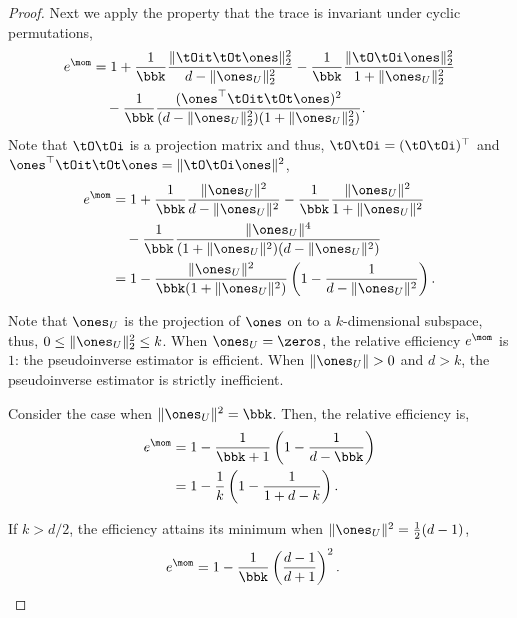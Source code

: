 \begin{proof}
Next we apply the property that the trace is invariant under cyclic
permutations,
\begin{align*}
  e^\mom
    &= 1 + \frac{1}{\bbk}
          \frac{
              \|\tOit \tOt \ones\|_2^2
          }{
            d - \|\ones_U\|_2^2 
          } 
        - \frac{1}{\bbk}
        \frac{\|\tO \tOi \ones\|_2^2}{1+ \|\ones_U\|_2^2} \\
    &\quad
    - \frac{1}{\bbk}
    \frac{(\ones^\top \tOit \tOt \ones)^2}
        {(d - \|\ones_U\|_2^2 ) (1+ \|\ones_U\|_2^2)}.
      \end{align*}
Note that $\tO\tOi$ is a projection matrix and thus, $\tO\tOi
      = (\tO\tOi)^\top$ and $\ones^\top \tOit\tOt \ones = \|\tO\tOi
      \ones\|^2$,
      \begin{align*}
        e^\mom
&= 1
+ \frac{1}{\bbk} \frac{\|\ones_U\|^2}{d - \|\ones_U\|^2}
    -  \frac{1}{\bbk}\frac{\|\ones_U\|^2}{1 + \|\ones_U\|^2}\\
&\quad
    -  \frac{1}{\bbk}\frac{\|\ones_U\|^4}{(1 + \|\ones_U\|^2)(d - \|\ones_U\|^2)} \\
    &= 1 - \frac{\|\ones_U\|^2}{\bbk (1 + \|\ones_U\|^2)} \left( 1 - \frac{1}{d - \|\ones_U\|^2} \right).
\end{align*}

Note that $\ones_U$ is the projection of $\ones$ on to a $k$-dimensional
subspace, thus, $0 \le \|\ones_U\|^2_2 \le k$.
When $\ones_U = \zeros$, the relative efficiency $e^\mom$ is $1$: the pseudoinverse estimator is efficient. When $\|\ones_U\| > 0$ and $d > k$, the pseudoinverse estimator is strictly inefficient.

Consider the case when $\|\ones_U\|^2 = \bbk$. Then, the relative efficiency
is,
\begin{align*}
  e^\mom 
    &= 1 - \frac{1}{\bbk +1} \left(1 - \frac{1}{d - \bbk} \right) \\
    &= 1 - \frac{1}{k} \left(1 - \frac{1}{1 + d - k} \right).
\end{align*}

If $k > d/2$, the efficiency attains its minimum when $\|\ones_U\|^2
= \frac{1}{2} (d-1)$, 
\begin{align*}
  e^\mom 
  &= 1 - \frac{1}{\bbk}\left(\frac{d-1}{d+1}\right)^2.
\end{align*}
\end{proof}


